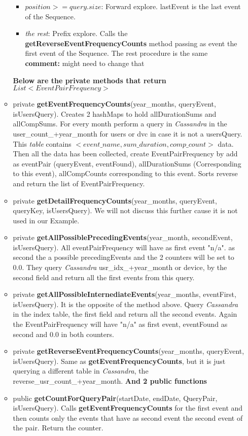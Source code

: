 \documentclass{article}
\begin{document}
\begin{itemize}
\begin{itemize}
\begin{itemize}
			\item $position>=query.size$: Forward explore. lastEvent is the last event of the Sequence.
			\item \textit{the rest}: Prefix explore. Calls the \textbf{getReverseEventFrequencyCounts} method passing as event the first event of the Sequence. The rest procedure is the same \textbf{comment:} might need to change that
		\end{itemize}
	
	\textbf{Below are the private methods that return $List<EventPairFrequency>$}
	\item private \textbf{getEventFrequencyCounts}(year\_months, queryEvent, isUsersQuery). Creates 2 hashMaps to hold allDurationSums and allCompSums. For every month perform a query in \textit{Cassandra} in the user\_count\_+year\_month for users or dvc in case it is not a usersQuery. This \textit{table} contains $<event\_name, sum\_duration, comp\_count>$ data. Then all the data has been collected, create EventPairFrequency by add as eventPair (queryEvent, eventFound), allDurationSums (Corresponding to this event), allCompCounts corresponding to this event. Sorts reverse and return the list of EventPairFrequency.
	\item private \textbf{getDetailFrequencyCounts}(year\_months, queryEvent, queryKey, isUsersQuery). We will not discuss this further cause it is not used in our Example.
	\item private \textbf{getAllPossiblePrecedingEvents}(year\_month, secondEvent, isUsersQuery). All eventPairFrequency will have as first event "n/a". as second the a possible precedingEvents and the 2 counters will be set to 0.0. They query \textit{Cassandra} usr\_idx\_+year\_month or device, by the second field and return all the first events from this query.
	\item private \textbf{getAllPossibleInternediateEvents}(year\_months, eventFirst, isUsersQuery). It is the opposite of the method above. Query \textit{Cassandra} in the index table, the first field and return all the second events. Again the EventPairFrequency will have "n/a" as first event, eventFound as second and 0.0 in both counters.
	\item private \textbf{getReverseEventFrequencyCounts}(year\_months, queryEvent, isUsersQuery). Same as \textbf{getEventFrequencyCounts}, but it is just querying a different table in \textit{Cassandra}, the reverse\_usr\_count\_+year\_month.
	\textbf{And 2 public functions}
	\item public \textbf{getCountForQueryPair}(startDate, endDate, QueryPair, isUsersQuery). Calls \textbf{getEventFrequencyCounts} for the first event and then counts only the events that have as second event the second event of the pair. Return the counter.

\end{itemize}
\end{itemize}
\end{document}
